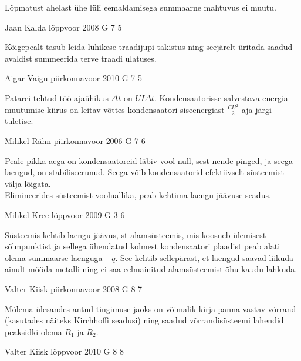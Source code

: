 \documentclass[11pt]{article}
\begin{document}
{{\ifHint
Lõpmatust ahelast ühe lüli eemaldamisega summaarne mahtuvus ei muutu.
\fi
}

{Jaan Kalda} %
{lõppvoor} %
{2008} %
{G 7} %
{5} %
{

\ifHint
Kõigepealt tasub leida lühikese traadijupi takistus ning seejärelt üritada saadud avaldist summeerida terve traadi ulatuses.
\fi
}

{Aigar Vaigu} %
{piirkonnavoor} %
{2010} %
{G 7} %
{5} %
{

\ifHint
Patarei tehtud töö ajaühikus $\Delta t$ on $UI\Delta t$. Kondensaatorisse salvestava energia muutumise kiirus on leitav võttes kondensaatori siseenergiast $\frac{CU^2}{2}$ aja järgi tuletise.
\fi
}

{Mihkel Rähn} %
{piirkonnavoor} %
{2006} %
{G 7} %
{6} %
{

\ifHint
\osa\osa Peale pikka aega on kondensaatoreid läbiv vool null, sest nende pinged, ja seega laengud, on stabiliseerunud. Seega võib kondensaatorid efektiivselt süsteemist välja lõigata.\\
\osa Elimineerides süsteemist vooluallika, peab kehtima laengu jäävuse seadus.
\fi
}

{Mihkel Kree} %
{lõppvoor} %
{2009} %
{G 3} %
{6} %
{

\ifHint
Süsteemis kehtib laengu jäävus, st alamsüsteemis, mis koosneb ülemisest sõlmpunktist ja sellega ühendatud kolmest kondensaatori plaadist peab alati olema summaarse laenguga $-q$. See kehtib sellepärast, et laengud saavad liikuda ainult mööda metalli ning ei saa eelmainitud alamsüsteemist õhu kaudu lahkuda.
\fi
}

{Valter Kiisk} %
{piirkonnavoor} %
{2008} %
{G 8} %
{7} %
{

\ifHint
Mõlema ülesandes antud tingimuse jaoks on võimalik kirja panna vastav võrrand (kasutades näiteks Kirchhoffi seadusi) ning saadud võrrandisüsteemi lahendid peaksidki olema $R_1$ ja $R_2$.
\fi
}

{Valter Kiisk} %
{lõppvoor} %
{2010} %
{G 8} %
{8} %
{

}}
\end{document}
